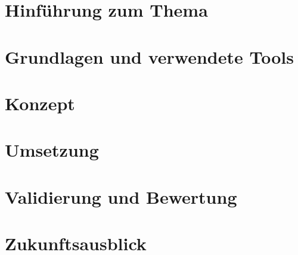 \documentclass[11pt]{article}
\begin{document}
    \pagestyle{empty}
    \pagestyle{scrheadings}
    \setcounter{secnumdepth}{0}

    
%


    \tableofcontents %
    \clearpage
    \listoffigures %
    \clearpage
    \listoftables %

    \setcounter{secnumdepth}{3}
    \setcounter{page}{1}

    \section{Hinführung zum Thema}
    \section{Grundlagen und verwendete Tools}
    \section{Konzept}
    \section{Umsetzung}
    \section{Validierung und Bewertung}
    \section{Zukunftsausblick}

    \clearpage


%
\end{document}
